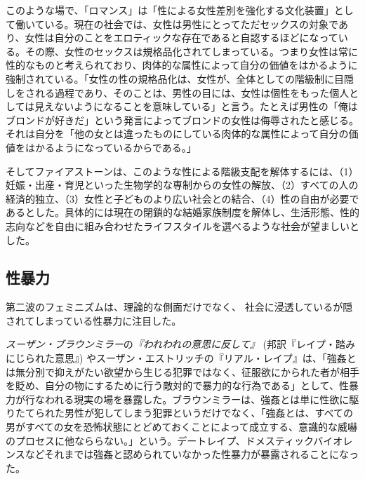 \documentclass[dvipdfmx,uplatex]{jsarticle}
\begin{document}
このような場で、「ロマンス」は「性による女性差別を強化する文化装置」として働いている。現在の社会では、女性は男性にとってただセックスの対象であり、女性は自分のことをエロティックな存在であると自認するほどになっている。その際、女性のセックスは規格品化されてしまっている。つまり女性は常に性的なものと考えられており、肉体的な属性によって自分の価値をはかるように強制されている。「女性の性の規格品化は、女性が、全体としての階級制に目隠しをされる過程であり、そのことは、男性の目には、女性は個性をもった個人としては見えないようになることを意味している」と言う。たとえば男性の「俺はブロンドが好きだ」という発言によってブロンドの女性は侮辱されたと感じる。それは自分を「他の女とは違ったものにしている肉体的な属性によって自分の価値をはかるようになっているからである。」

そしてファイアストーンは、このような性による階級支配を解体するには、（1）妊娠・出産・育児といった生物学的な専制からの女性の解放、（2）すべての人の経済的独立、（3）女性と子どものより広い社会との結合、（4）性の自由が必要であるとした。具体的には現在の閉鎖的な結婚家族制度を解体し、生活形態、性的志向などを自由に組み合わせたライフスタイルを選べるような社会が望ましいとした。



\subsection{性暴力}

第二波のフェミニズムは、理論的な側面だけでなく、
社会に浸透しているが隠されてしまっている性暴力に注目した。



\emph{スーザン・ブラウンミラー}の\emph{『われわれの意思に反して』} (邦訳『レイプ・踏みにじられた意思』) \citep{brownmiller75:_again_our_will} やスーザン・エストリッチの『リアル・レイプ』\citep{estrich87:_real_rape}は、「強姦とは無分別で抑えがたい欲望から生じる犯罪ではなく、征服欲にかられた者が相手を貶め、自分の物にするために行う敵対的で暴力的な行為である」として、性暴力が行なわれる現実の場を暴露した。ブラウンミラーは、強姦とは単に性欲に駆りたてられた男性が犯してしまう犯罪というだけでなく、「強姦とは、すべての男がすべての女を恐怖状態にとどめておくことによって成立する、意識的な威嚇のプロセスに他なららない。\citep[邦訳p.6]{brownmiller75:_again_our_will}」という。デートレイプ、ドメスティックバイオレンスなどそれまでは強姦と認められていなかった性暴力が暴露されることになった。



\end{document}
